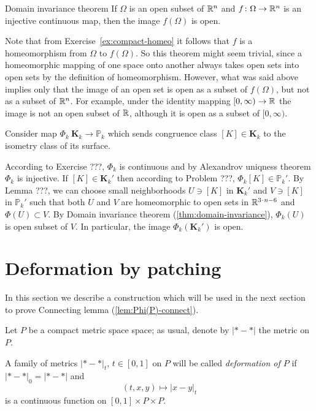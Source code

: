 \begin{thm}{Domain invariance theorem}\label{thm:domain-invariance}
If $\Omega$ is an open subset of $\mathbb{R}^n$ 
and $f\colon\Omega \to \mathbb{R}^n$ is an injective continuous map,
then the image $f(\Omega)$ is open.
\end{thm}

Note that from Exercise~\ref{ex:compact-homeo} it follows that $f$ is a homeomorphism from $\Omega$ to $f(\Omega)$.
So this theorem might seem trivial, 
since a homeomorphic mapping of one space onto
another always takes open sets into open sets by the definition of homeomorphism.
However, what was said above implies only that the image of an open set is open
as a subset of $f(\Omega)$, but not as a subset of $\mathbb{R}^n$. For example, under the identity mapping $[0,\infty)\to \mathbb{R}$ the image is not an open subset of $\mathbb{R}$, although it is open as a subset of $[0,\infty)$.


Consider map $\Phi_k\:\mathbf{K}_k\to\mathbb{P}_k$
which sends congruence class $[K]\in \mathbf{K}_k$
to the isometry class of its surface.

According to Exercise ???, $\Phi_k$ is continuous
and by Alexandrov uniqness theorem $\Phi_k$ is injective.
If $[K]\in \mathbf{K}_k'$ then according to Problem ???, $\Phi_k[K]\in \mathbb{P}_k'$.
By Lemma ???, we can choose small neighborhoods $U\ni [K]$ in $\mathbf{K}_k'$ and $V\ni [K]$ in $\mathbb{P}_k'$
such that both $U$ and $V$ are homeomorphic to open sets in $\RR^{3\cdot n-6}$ and $\Phi(U)\subset V$.
By  Domain invariance theorem (\ref{thm:domain-invariance}),
$\Phi_k(U)$ is open subset of $V$.
In particular, the image $\Phi_k(\mathbf{K}_k')$ is open.
\qeds




 
 
\section{Deformation by patching}\label{sec:deformation}

In this section we describe a construction which will be used in the next section to prove Connecting lemma (\ref{lem:Phi(P)-connect}).


Let $P$ be a compact metric space space;
as usual, denote by $|{*}-{*}|$ the metric on $P$.

A family of metrics $|{*}-{*}|_t$,
$t\in[0,1]$ on $P$
will be called \emph{deformation of $P$}
if $|{*}-{*}|_0=|{*}-{*}|$ 
and 
$$(t,x,y)\mapsto |x-y|_t$$
is a continuous function on
$[0,1]\times P\times P$.

